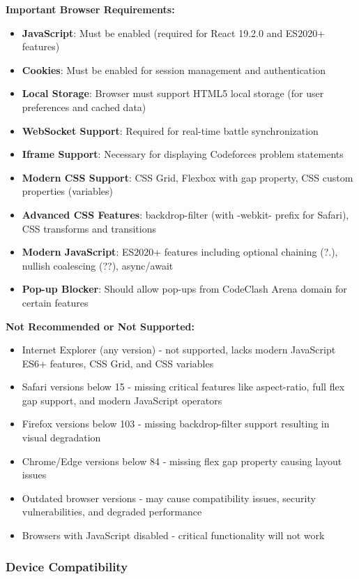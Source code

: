 \documentclass[12pt]{article}
\begin{document}
\textbf{Important Browser Requirements:}
\begin{itemize}
\item \textbf{JavaScript}: Must be enabled (required for React 19.2.0 and ES2020+ features)
\item \textbf{Cookies}: Must be enabled for session management and authentication
\item \textbf{Local Storage}: Browser must support HTML5 local storage (for user preferences and cached data)
\item \textbf{WebSocket Support}: Required for real-time battle synchronization
\item \textbf{Iframe Support}: Necessary for displaying Codeforces problem statements
\item \textbf{Modern CSS Support}: CSS Grid, Flexbox with gap property, CSS custom properties (variables)
\item \textbf{Advanced CSS Features}: backdrop-filter (with -webkit- prefix for Safari), CSS transforms and transitions
\item \textbf{Modern JavaScript}: ES2020+ features including optional chaining (?.), nullish coalescing (??), async/await
\item \textbf{Pop-up Blocker}: Should allow pop-ups from CodeClash Arena domain for certain features
\end{itemize}

\textbf{Not Recommended or Not Supported:}
\begin{itemize}
\item Internet Explorer (any version) - not supported, lacks modern JavaScript ES6+ features, CSS Grid, and CSS variables
\item Safari versions below 15 - missing critical features like aspect-ratio, full flex gap support, and modern JavaScript operators
\item Firefox versions below 103 - missing backdrop-filter support resulting in visual degradation
\item Chrome/Edge versions below 84 - missing flex gap property causing layout issues
\item Outdated browser versions - may cause compatibility issues, security vulnerabilities, and degraded performance
\item Browsers with JavaScript disabled - critical functionality will not work
\end{itemize}

\clearpage
\subsubsection{Device Compatibility}
\end{document}
